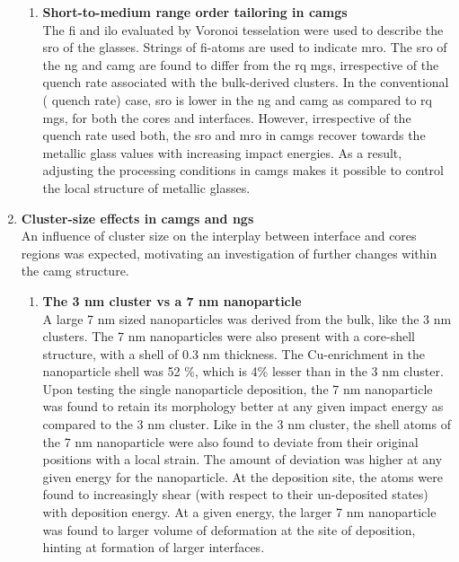 \begin{enumerate}[leftmargin=*]
\begin{enumerate}[leftmargin=*]
\item \textbf{Short-to-medium range order tailoring in \cz \gls{camg}s}\\
The \gls{fi} and \gls{ilo} evaluated by Voronoi tesselation were used to describe the \gls{sro} of the glasses. Strings of \gls{fi}-atoms are used to indicate \gls{mro}. The \gls{sro} of the \gls{ng} and \gls{camg} are found to differ from the \gls{rq} \gls{mg}s, irrespective of the quench rate associated with the bulk-derived clusters. In the conventional ( quench rate) case, \gls{sro} is lower in the \gls{ng} and \gls{camg} as compared to \gls{rq} \gls{mg}s, for both the cores and interfaces. However, irrespective of the quench rate used both, the \gls{sro} and \gls{mro} in \gls{camg}s recover towards the metallic glass values with increasing impact energies. As a result, adjusting the processing conditions in \gls{camg}s makes it possible to control the local structure of metallic glasses.
\end{enumerate}

\item \textbf{Cluster-size effects in \gls{camg}s and \gls{ng}s}\\
An influence of cluster size on the interplay between interface and cores regions was expected, motivating an investigation of further changes within the \gls{camg} structure.

\begin{enumerate}[leftmargin=*]
\item \textbf{The 3 nm cluster vs a 7 nm \cz nanoparticle}\\
A large 7 nm sized \cz nanoparticles was derived from the bulk, like the 3 nm clusters. The 7 nm nanoparticles were also present with a core-shell structure, with a shell of 0.3 nm thickness. The Cu-enrichment in the nanoparticle shell was 52 \%, which is 4\% lesser than in the 3 nm cluster. Upon testing the single nanoparticle deposition, the 7 nm nanoparticle was found to retain its morphology better at any given impact energy as compared to the 3 nm cluster. Like in the 3 nm cluster, the shell atoms of the 7 nm nanoparticle were also found to deviate from their original positions with a local strain. The amount of deviation was higher at any given energy for the nanoparticle. At the deposition site, the atoms were found to increasingly shear (with respect to their un-deposited states) with deposition energy.
At a given energy, the larger 7 nm nanoparticle was found to larger volume of deformation at the site of deposition, hinting at formation of larger interfaces. \par 


\end{enumerate}
\end{enumerate}
